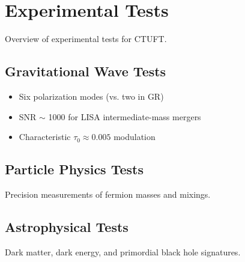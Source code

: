 \section{Experimental Tests}
\label{sec:experimental}

Overview of experimental tests for CTUFT.

\subsection{Gravitational Wave Tests}

\begin{itemize}
    \item Six polarization modes (vs. two in GR)
    \item SNR $\sim$ 1000 for LISA intermediate-mass mergers
    \item Characteristic $\tau_0 \approx 0.005$ modulation
\end{itemize}

\subsection{Particle Physics Tests}

Precision measurements of fermion masses and mixings.

\subsection{Astrophysical Tests}

Dark matter, dark energy, and primordial black hole signatures.
